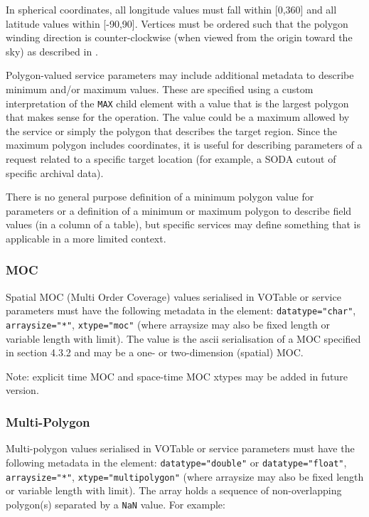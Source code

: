 \documentclass[11pt,letter]{ivoa}
\begin{document}
In spherical coordinates, all longitude values must fall within [0,360] and all 
latitude values within [-90,90]. Vertices must be ordered such that the polygon 
winding direction is counter-clockwise (when viewed from the origin toward the 
sky) as described in \citep{2007ivoa.spec.1030R}.

Polygon-valued service parameters may include additional metadata to describe minimum
and/or maximum values. These are specified using a custom interpretation of the
\verb|MAX| child element with a value that is the largest polygon that makes sense
for the operation. The value could be a maximum allowed by the service or simply
the polygon that describes the target region. Since the maximum polygon includes
coordinates, it is useful for describing parameters of a request related
to a specific target location (for example, a SODA cutout of specific archival data).

There is no general purpose definition of a minimum polygon value for parameters or
a definition of a minimum or maximum polygon to describe field values (in a column
of a table), but specific services may define something that is applicable in a
more limited context.

\subsubsection{MOC}
Spatial MOC (Multi Order Coverage) values serialised in VOTable or service parameters must 
have the following metadata in the  element: 
\verb|datatype="char"|, \verb|arraysize="*"|, \verb|xtype="moc"|
(where arraysize may also be fixed length or variable length with limit).
The value is the ascii serialisation of a MOC specified in \citet{2022ivoa.spec.0727F}
section 4.3.2 and may be a one- or two-dimension (spatial) MOC.

Note: explicit time MOC and space-time MOC xtypes may be added in future version.

\subsubsection{Multi-Polygon}
Multi-polygon values serialised in VOTable or service parameters must have the 
following metadata in the  element:  \verb|datatype="double"| or \verb|datatype="float"|, 
\verb|arraysize="*"|, \verb|xtype="multipolygon"|
(where arraysize may also be fixed length or variable length with limit).
The array holds a sequence of non-overlapping polygon(s) separated by a \verb|NaN| value. For example:
\end{document}
